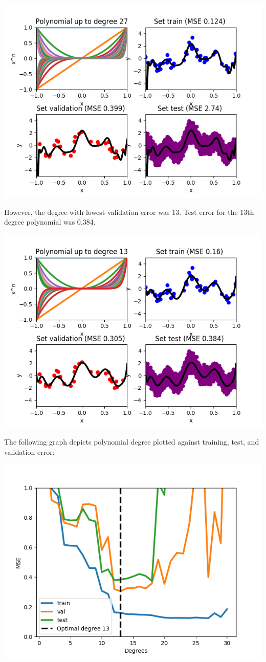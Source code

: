 \documentclass[a4paper]{article}
\begin{document}
\includegraphics[width=\textwidth]{linreg_deg27.png}

However, the degree with lowest validation error was 13.  Test error for the 13th degree polynomial was 0.384.

\includegraphics[width=\textwidth]{linreg_deg13.png}

The following graph depicts polynomial degree plotted against training, test, and validation error:

\includegraphics[width=\textwidth]{linreg_error_plot.png}
\end{document}
